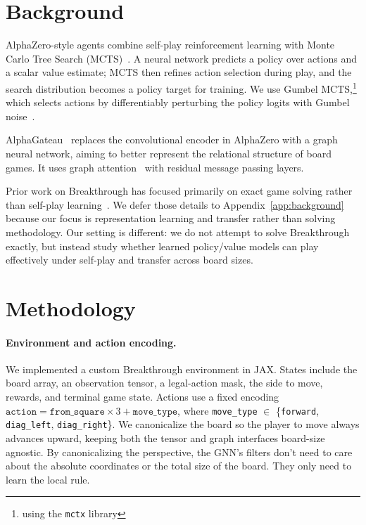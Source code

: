 \documentclass{article}
\begin{document}
\section{Background}

AlphaZero-style agents combine self-play reinforcement learning with Monte Carlo Tree Search
(MCTS)~\cite{alphazero}.
A neural network predicts a policy over actions and a scalar value estimate; MCTS then refines
action selection during play, and the search distribution becomes a policy target for training.
We use Gumbel MCTS,\footnote{using the \texttt{mctx} library} which selects actions by
differentiably perturbing the policy logits with Gumbel noise~\cite{muzero}.

AlphaGateau~\cite{alphagateau} replaces the convolutional encoder in AlphaZero with a graph
neural network, aiming to better represent the relational structure of board games.
It uses graph attention~\cite{gat} with residual message passing layers.

Prior work on Breakthrough has focused primarily on exact game solving rather than self-play
learning~\cite{saffidine2011breakthrough,jonsson2025solving}. We defer those details to
Appendix~\ref{app:background} because our focus is representation learning and transfer rather
than solving methodology.
Our setting is different: we do not attempt to solve Breakthrough exactly, but instead study
whether learned policy/value models can play effectively under self-play and transfer across board
sizes.



\section{Methodology}

\paragraph{Environment and action encoding.}
We implemented a custom Breakthrough environment in JAX.
States include the board array, an observation tensor, a legal-action mask, the side to move, rewards, and terminal game state.
Actions use a fixed encoding $\texttt{action} = \texttt{from\_square} \times 3 + \texttt{move\_type}$,
where \texttt{move\_type} $\in$ \{\texttt{forward}, \texttt{diag\_left}, \texttt{diag\_right}\}.
We canonicalize the board so the player to move always advances upward, keeping both the tensor
and graph interfaces board-size agnostic.
By canonicalizing the perspective, the GNN's filters don't need to care about the absolute coordinates or the total size of the board.
They only need to learn the local rule.
\end{document}
